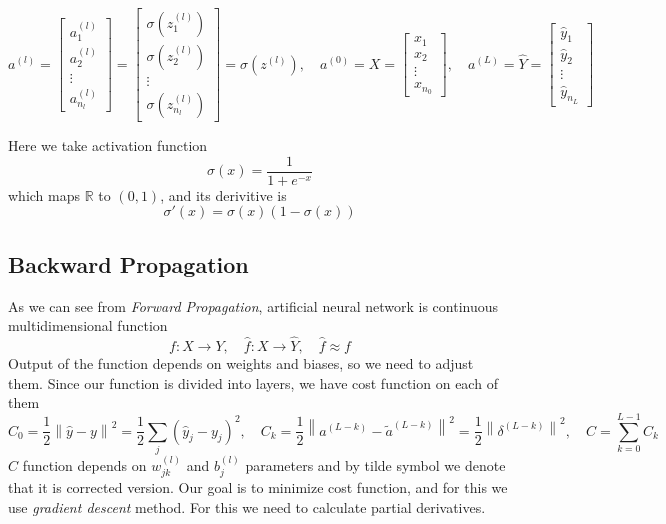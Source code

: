 \documentclass{article}
\numberwithin{equation}{section}
\theoremstyle{definition}
\theoremstyle{remark}
\begin{document}
\[
    a^{(l)} =
    \begin{bmatrix}
       a_{1}^{(l)} \\[5pt]
       a_{2}^{(l)} \\[5pt]
        \vdots \\[5pt]
       a_{n_{l}}^{(l)}
    \end{bmatrix} =
    \begin{bmatrix}
       \sigma\left( z_{1}^{(l)} \right)\\[5pt]
       \sigma\left( z_{2}^{(l)} \right)\\[5pt]
        \vdots \\[5pt]
       \sigma\left( z_{n_{l}}^{(l)} \right)
    \end{bmatrix}
    = \sigma \left( z^{(l)} \right), \quad
    a^{(0)} = X = \begin{bmatrix}
       x_{1} \\[5pt]
       x_{2} \\[5pt]
        \vdots \\[5pt]
       x_{n_{0}}
    \end{bmatrix}, \quad a^{(L)} = \hat{Y} = \begin{bmatrix}
       \hat{y}_{1} \\[5pt]
       \hat{y}_{2} \\[5pt]
        \vdots \\[5pt]
       \hat{y}_{n_{L}}
    \end{bmatrix}
\]

\noindent
Here we take activation function
\[
    \sigma \left( x \right) = \frac{1}{1+e^{-x}}
\]
which maps $\mathbb{R}$ to $(0,1)$, and its derivitive is
\[
    \sigma' \left( x \right) = \sigma \left( x \right)
    \left( 1 - \sigma \left( x \right) \right)
\]




\subsection{Backward Propagation}

As we can see from \textit{Forward Propagation}, artificial neural network is continuous multidimensional function
\[
    f: X \to Y, \quad \hat{f}: X \to \hat{Y}, \quad \hat{f} \approx f
\]
Output of the function depends on weights and biases, so we need to adjust them. Since our function is divided into layers, we have cost function on each of them
\[
    C_{0} = \frac{1}{2} \left\| \hat{y} - y \right\|^2 = \frac{1}{2} \sum_{j} \left( \hat{y}_{j} - y_{j} \right)^2, \quad
    C_{k} = \frac{1}{2} \left\| a^{(L-k)} - \tilde{a}^{(L-k)} \right\|^2 =
    \frac{1}{2} \left\| \delta^{(L-k)} \right\|^2, \quad
    C =  \sum_{k=0}^{L-1} C_{k}
\]
$C$ function depends on $w_{jk}^{(l)}$ and $b_{j}^{(l)}$ parameters and by tilde symbol we denote that it is corrected version. Our goal is to minimize cost function, and for this we use \textit{gradient descent} method. For this we need to calculate partial derivatives.
\end{document}
